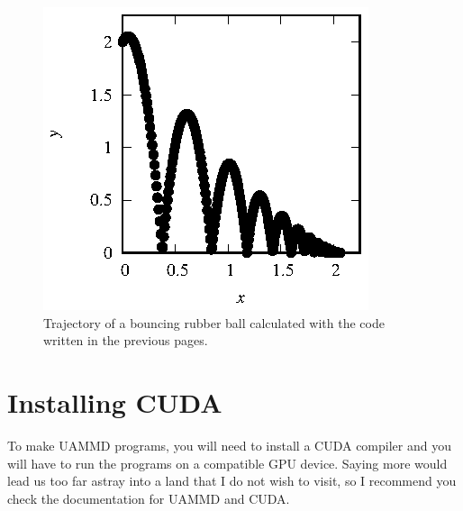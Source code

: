 \begin{figure}
  \centering
  \includegraphics[width = 0.65 \textwidth]{figures/rubberBall.eps}
  \caption{\label{rubberBall}Trajectory of a bouncing rubber ball calculated
           with the code written in the previous pages.}
\end{figure}


\section*{Installing CUDA}

To make UAMMD programs, you will need to install a CUDA compiler and you will
have to run the programs on a compatible GPU device. Saying more would lead us
too far astray into a land that I do not wish to visit, so I recommend you check
the documentation for UAMMD and CUDA.

